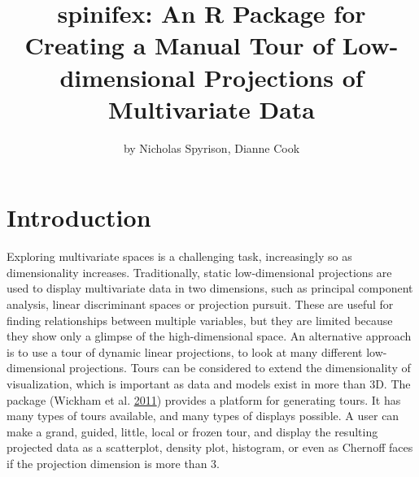 \title{spinifex: An R Package for Creating a Manual Tour of Low-dimensional
Projections of Multivariate Data}
\author{by Nicholas Spyrison, Dianne Cook}

\maketitle





\hypertarget{introduction}{%
\section{Introduction}\label{introduction}}

Exploring multivariate spaces is a challenging task, increasingly so as
dimensionality increases. Traditionally, static low-dimensional
projections are used to display multivariate data in two dimensions,
such as principal component analysis, linear discriminant spaces or
projection pursuit. These are useful for finding relationships between
multiple variables, but they are limited because they show only a
glimpse of the high-dimensional space. An alternative approach is to use
a tour of dynamic linear projections, to look at many different
low-dimensional projections. Tours can be considered to extend the
dimensionality of visualization, which is important as data and models
exist in more than 3D. The package  (Wickham et al.
\protect\hyperlink{ref-wickham_tourr_2011}{2011}) provides a platform
for generating tours. It has many types of tours available, and many
types of displays possible. A user can make a grand, guided, little,
local or frozen tour, and display the resulting projected data as a
scatterplot, density plot, histogram, or even as Chernoff faces if the
projection dimension is more than 3.

